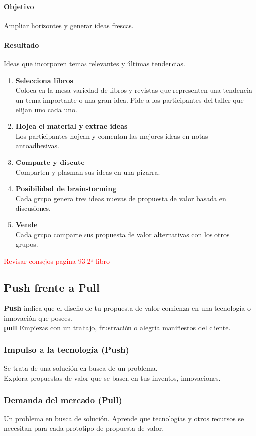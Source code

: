 \documentclass[11pt]{book}
\begin{document}
\paragraph{Objetivo}
Ampliar horizontes y generar ideas frescas.
\paragraph{Resultado}
Ideas que incorporen temas relevantes y últimas tendencias.
\begin{enumerate}
\item \textbf{ Selecciona libros }\\
Coloca en la mesa variedad de libros y revistas que representen una tendencia un tema importante o una gran idea. Pide a los participantes del taller que elijan uno cada uno.
\item \textbf{ Hojea el material y extrae ideas }\\
Los participantes hojean y comentan las mejores ideas en notas antoadhesivas.
\item \textbf{ Comparte y discute }\\
Comparten y plasman sus ideas en una pizarra.
\item \textbf{ Posibilidad de brainstorming }\\
Cada grupo genera tres ideas nuevas de propuesta de valor basada en discusiones.
\item \textbf{ Vende }\\
Cada grupo comparte sus propuesta de valor alternativas con los otros grupos.

\end{enumerate}
 \textcolor{red}{Revisar consejos pagina 93 2º libro}
\subsection{Push frente a Pull}
\textbf{Push} indica que el diseño de tu propuesta de valor comienza en una tecnología o innovación que posees.\\
\textbf{pull} Empiezas con un trabajo, frustración o alegría manifiestos del cliente.
\subsubsection{Impulso a la tecnología (Push)}
Se trata de una solución en busca de un problema.\\
Explora propuestas de valor que se basen en tus inventos, innovaciones.
\subsubsection{Demanda del mercado (Pull)}
Un problema en busca de solución.
Aprende que tecnologías y otros recursos se necesitan para cada prototipo de propuesta de valor.
\end{document}
